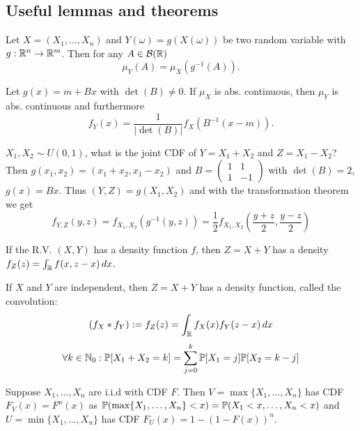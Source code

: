 \subsection{Useful lemmas and theorems}

\begin{definition*}
  Let \(X = (X_1, \ldots, X_n)\) and \(Y(\omega) = g(X(\omega))\) be two random variable with \(g: \R^n \to \R^m\). Then for any \(A \in \B(\R)\)
  \[\mu_Y(A) = \mu_X(g^{-1}(A)).\]
\end{definition*}

\begin{theorem*}
  Let \(g(x) = m + Bx\) with \(\det(B) \neq 0\). If \(\mu_X\) is abs. continuous, then \(\mu_Y\) is abs. continuous and furthermore
  \[f_Y(x) = \frac{1}{|\det(B)|} f_X(B^{-1}(x - m)).\]
\end{theorem*}

\begin{example}
  \(X_1, X_2 \sim U(0, 1)\), what is the joint CDF of \(Y = X_1 + X_2\) and \(Z = X_1 - X_2\)? \\
  Then \(g(x_1, x_2) = (x_1 + x_2, x_1 - x_2)\) and \(B = \begin{pmatrix}
    1 & 1 \\
    1 & -1
  \end{pmatrix}\) with \(\det (B) = 2\), \(g(x) = Bx\). Thus \((Y, Z) = g(X_1, X_2)\) and with the transformation theorem we get
  \[f_{Y, Z}(y, z) = f_{X_1, X_2}(g^{-1}(y, z)) = \frac{1}{2}f_{X_1, X_2}\left(\frac{y+z}{2}, \frac{y-z}{2}\right)\]
\end{example}

\begin{proposition}
  If the R.V. \((X, Y)\) has a density function \(f\), then \(Z = X + Y\) has a density 
  \(f_Z(z) = \int_\R f(x, z - x) \, dx\).
\end{proposition}

\begin{definition*}[Convolution]
  If \(X\) and \(Y\) are independent, then \(Z = X + Y\) has a density function, called the convolution:
  \[(f_X * f_Y) := f_Z(z) = \int_\R f_X(x)f_Y(z - x) \, dx\]
  \[\forall k \in \N_0 : \P[X_1 + X_2 = k] = \sum_{j=0}^k \P[X_1 = j] \P[X_2 = k - j]\]
\end{definition*}

\begin{proposition}
  Suppose \(X_1, \ldots, X_n\) are i.i.d with CDF \(F\). Then \(V = \max\{X_1, \ldots, X_n\}\) has CDF \(F_V(x) = F^n(x) \) as \(\P(\max\{X_1, \ldots, X_n\} < x) = \P(X_1 < x, \ldots, X_n < x)\) and
  \(U = \min \{X_1, \ldots, X_n\}\) has CDF \(F_U(x) = 1 - (1 - F(x))^n\).
\end{proposition}

